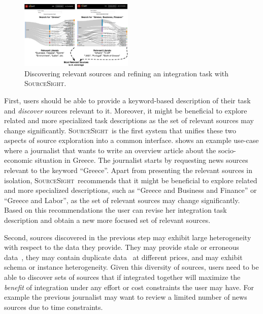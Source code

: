 \documentclass{vldb}
\newcommand\system{\textsc{SourceSight}}
\begin{document}
\begin{figure}
	\begin{center}
	\includegraphics[trim=0 0 0 60, clip,width=0.48\textwidth]{fig/exploreCor}
	\vspace{-20pt}
	\caption{Discovering relevant sources and refining an integration task with \system.}
	\label{fig:exploration}
	\end{center}
	\vspace{-22pt}
\end{figure}


First, users should be able to provide a keyword-based description of their task and {\em discover} sources relevant to it. Moreover, it might be beneficial to explore related and more specialized task descriptions as the set of relevant sources may change significantly. \system~is the first system that unifies these two aspects of source exploration into  a common interface.  shows an example use-case where a journalist that wants to write an overview article about the socio-economic situation in Greece. The journalist starts by requesting news sources relevant to the keyword ``Greece''. Apart from presenting the relevant sources in isolation, \system~recommends that it might be beneficial to explore related and more specialized descriptions, such as ``Greece and Business and Finance'' or ``Greece and Labor'', as the set of relevant sources may change significantly. Based on this recommendations the user can revise her integration task description and obtain a new more focused set of relevant sources.

Second, sources discovered in the previous step may exhibit large heterogeneity with respect to the data they provide. They may provide stale or erroneous data~\cite{Dong_vldb:2009, li:2012}, they may contain duplicate data~\cite{bronzi:2013, li:2012} at different prices, and may exhibit schema or instance heterogeneity. Given this diversity of sources, users need to be able to discover sets of sources that if integrated together will maximize the {\em benefit} of integration under any effort or cost constraints the user may have. For example the previous journalist may want to review a limited number of news sources due to time constraints. 
\end{document}
